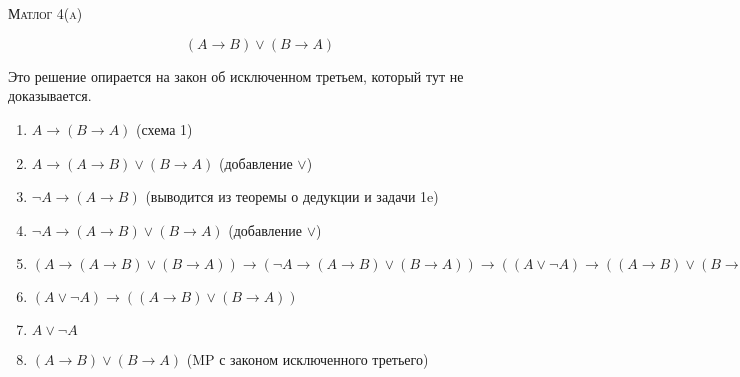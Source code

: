 \documentclass[10pt]{article}
\theoremstyle{definition}
\begin{document}
\def\chap#1#2{\ \\ {\large\bf#1 \ | \ \tt\scshape#2} \par}

\ \vspace{-1cm}

{\bf
\ \\
\Large\centerline{\scshape Матлог 4(a)}
}\normalsize

\[ (A \to B) \lor (B \to A)\]

Это решение опирается на закон об исключенном третьем, который тут не доказывается.
\begin{enumerate}
    \item $A \to (B \to A)$ (схема 1)
    \item $A \to (A\to B) \lor (B \to A)$ (добавление $\lor$)
    \item $\neg A \to (A \to B)$ (выводится из теоремы о дедукции и задачи 1e)
    \item $\neg A \to (A\to B) \lor (B \to A)$ (добавление $\lor$)
    \item $(A \to (A\to B) \lor (B \to A)) \to (\neg A \to (A \to B) \lor (B \to A)) \to ((A \lor \neg A) \to ((A \to B) \lor (B \to A)))$
    \item $(A \lor \neg A) \to ((A \to B) \lor (B \to A))$
    \item $A \lor \neg A$
    \item $(A \to B) \lor (B \to A)$ (MP с законом исключенного третьего) 
 \end{enumerate}
\end{document}

